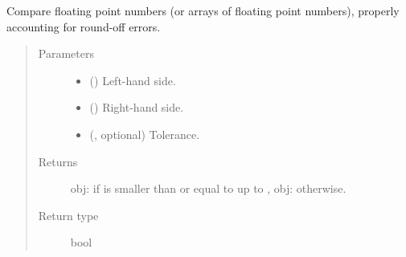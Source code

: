 \documentclass[letterpaper,10pt,english]{sphinxmanual}
\begin{document}

\begin{fulllineitems}
\label{\detokenize{api:utils.smaller_or_equal_than}}
Compare floating point numbers (or arrays of floating point numbers),
properly accounting for round-off errors.
\begin{quote}\begin{description}
\item[{Parameters}] \leavevmode\begin{itemize}
\item {} 
 () \textendash{} Left-hand side.

\item {} 
 () \textendash{} Right-hand side.

\item {} 
 (, optional) \textendash{} Tolerance.

\end{itemize}

\item[{Returns}] \leavevmode
obj: if  is smaller than or equal to  up to , obj: otherwise.

\item[{Return type}] \leavevmode
bool

\end{description}\end{quote}

\end{fulllineitems}

\end{document}
